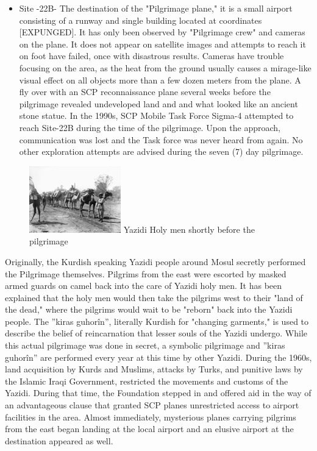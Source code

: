 \begin{itemize}
\item Site -22B- The destination of the "Pilgrimage plane," it is a small airport consisting of a runway and single building located at coordinates [EXPUNGED]. It has only been observed by "Pilgrimage crew" and cameras on the plane. It does not appear on satellite images and attempts to reach it on foot have failed, once with disastrous results. Cameras have trouble focusing on the area, as the heat from the ground usually causes a mirage-like visual effect on all objects more than a few dozen meters from the plane. A fly over with an SCP reconnaissance plane several weeks before the pilgrimage revealed undeveloped land and and what looked like an ancient stone statue. In the 1990s, SCP Mobile Task Force Sigma-4 attempted to reach Site-22B during the time of the pilgrimage. Upon the approach, communication was lost and the Task force was never heard from again. No other exploration attempts are advised during the seven (7) day pilgrimage.
\end{itemize}
\begin{figure}[h]
\begin{center}
\includegraphics[scale=1.2]{scp/036b.jpg}
\linebreak Yazidi Holy men shortly before the pilgrimage
\end{center}
\end{figure}

Originally, the Kurdish speaking Yazidi people around Mosul secretly performed the Pilgrimage themselves. Pilgrims from the east were escorted by masked armed guards on camel back into the care of Yazidi holy men. It has been explained that the holy men would then take the pilgrims west to their "land of the dead," where the pilgrims would wait to be "reborn" back into the Yazidi people. The ''kiras guhor\^{i}n'', literally Kurdish for "changing garments," is used to describe the belief of reincarnation that lesser souls of the Yazidi undergo. While this actual pilgrimage was done in secret, a symbolic pilgrimage and ''kiras guhor\^{i}n'' are performed every year at this time by other Yazidi.
During the 1960s, land acquisition by Kurds and Muslims, attacks by Turks, and punitive laws by the Islamic Iraqi Government, restricted the movements and customs of the Yazidi. During that time, the Foundation stepped in and offered aid in the way of an advantageous clause that granted SCP planes unrestricted access to airport facilities in the area. Almost immediately, mysterious planes carrying pilgrims from the east began landing at the local airport and an elusive airport at the destination appeared as well.